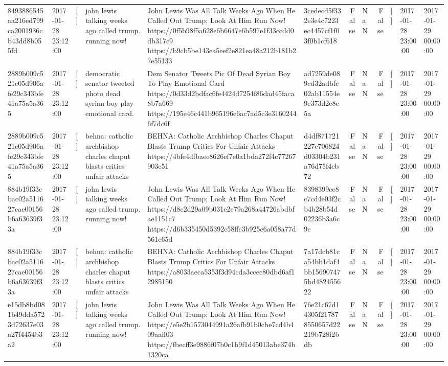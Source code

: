 \begin{tabular}{llllllrlrlll}
8493886545aa216ed799ca2001936cb43dd8b055fd & 2017-01-28 23:12:00 & [] & john lewis talking weeks ago called trump. running now! & John Lewis Was All Talk Weeks Ago When He Called Out Trump; Look At Him Run Now! https://0f5b98f5a628e6b6647e6b597e1f33ccdd0db317c9 https://b9cb5be143ea5eef2e821ea48a212b181b27e55133 & 3cedecd5f332e3e4c7223ec4457cf1f03f0b1cf618 & False & NaN & False & [] & 2017-01-28 23:00:00 & 2017-01-29 00:00:00 \\
2889b009c521c05d906afe29c343bfe41a75a5a365 & 2017-01-28 23:12:00 & [] & democratic senator tweeted photo dead syrian boy play emotional card. & Dem Senator Tweets Pic Of Dead Syrian Boy To Play Emotional Card https://0d33d2bdfac6fe4424d7254f86dad45faca8b7a669 https://195e46c441b965196e6ac7ad5c3e31602446f7dc6f & ad7259de089cd32adbfc02ab11554e9c373d2e8c5a & False & NaN & False & [] & 2017-01-28 23:00:00 & 2017-01-29 00:00:00 \\
2889b009c521c05d906afe29c343bfe41a75a5a365 & 2017-01-28 23:12:00 & [] & behna: catholic archbishop charles chaput blasts critics unfair attacks & BEHNA: Catholic Archbishop Charles Chaput Blasts Trump Critics For Unfair Attacks https://4bfe4dfbaee8626ef7e0a1bda272f4c77267903c51 & d4df871721227e706824d03304b231a76d75f4eb72 & False & NaN & False & [] & 2017-01-28 23:00:00 & 2017-01-29 00:00:00 \\
884b19f33cbac02a511627cae00156b6a63639f33a & 2017-01-28 23:12:00 & [] & john lewis talking weeks ago called trump. running now! & John Lewis Was All Talk Weeks Ago When He Called Out Trump; Look At Him Run Now! https://d8c2d29a09b031e2c79a268a44726abdbfae1151c7 https://d6b335450d5392c58ffc3b925c6a058a77d561c65d & 8398399ce8c7cd4e03f2cb4b28b54d02236b3a6c9c & False & NaN & False & [] & 2017-01-28 23:00:00 & 2017-01-29 00:00:00 \\
884b19f33cbac02a511627cae00156b6a63639f33a & 2017-01-28 23:12:00 & [] & behna: catholic archbishop charles chaput blasts critics unfair attacks & BEHNA: Catholic Archbishop Charles Chaput Blasts Trump Critics For Unfair Attacks https://a8033aeca5353f3d94cda3ccec80dbd6af12985150 & 7a17dcb81ca54bb1daf4bb156907475bd482455622 & False & NaN & False & [] & 2017-01-28 23:00:00 & 2017-01-29 00:00:00 \\
e15db8bd081b49dda5723d72637e03a27f4454b3a2 & 2017-01-28 23:12:00 & [] & john lewis talking weeks ago called trump. running now! & John Lewis Was All Talk Weeks Ago When He Called Out Trump; Look At Him Run Now! https://e5e2b1573044991a26afb91b0cbe7cd4b409aaff03 https://fbecff3e9886f07b0c1b9f1d45013abe374b1320ca & 76e21c67d14305f217878550657d22219b728f2bdb & False & NaN & False & [] & 2017-01-28 23:00:00 & 2017-01-29 00:00:00 \\

\end{tabular}
